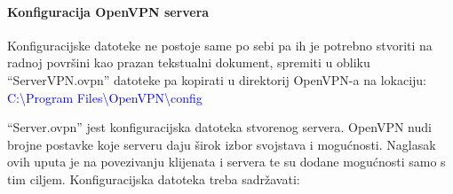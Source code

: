 \paragraph*{Konfiguracija OpenVPN servera}
\hfill \bigbreak
Konfiguracijske datoteke ne postoje same po sebi pa ih je potrebno stvoriti na radnoj površini kao prazan tekstualni dokument, spremiti u obliku ``ServerVPN.ovpn'' datoteke pa kopirati u direktorij OpenVPN-a na lokaciju:\smallbreak
\small\textcolor{blue}{C:\textbackslash Program Files\textbackslash OpenVPN\textbackslash config}
\smallbreak

``Server.ovpn'' jest konfiguracijska datoteka stvorenog servera. OpenVPN nudi brojne postavke koje serveru daju širok izbor svojstava i mogućnosti. Naglasak ovih uputa je na povezivanju klijenata i servera te su dodane mogućnosti samo s tim ciljem.\smallbreak
Konfiguracijska datoteka treba sadržavati:\smallbreak

